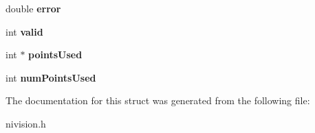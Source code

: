 \begin{DoxyCompactItemize}
\item 
\hypertarget{structBestEllipse2__struct_aaa2ac4cc8639fde286723fa2154bbc69}{
double {\bfseries error}}
\label{structBestEllipse2__struct_aaa2ac4cc8639fde286723fa2154bbc69}

\item 
\hypertarget{structBestEllipse2__struct_a0dbb91e79bbe2676ec1ace63fbf6b3ec}{
int {\bfseries valid}}
\label{structBestEllipse2__struct_a0dbb91e79bbe2676ec1ace63fbf6b3ec}

\item 
\hypertarget{structBestEllipse2__struct_aea03634e451f6cefc809dcb34ff55873}{
int $\ast$ {\bfseries pointsUsed}}
\label{structBestEllipse2__struct_aea03634e451f6cefc809dcb34ff55873}

\item 
\hypertarget{structBestEllipse2__struct_a1c152f7ec28e71759a0b62cbed7d9f71}{
int {\bfseries numPointsUsed}}
\label{structBestEllipse2__struct_a1c152f7ec28e71759a0b62cbed7d9f71}

\end{DoxyCompactItemize}


The documentation for this struct was generated from the following file:\begin{DoxyCompactItemize}
\item 
nivision.h\end{DoxyCompactItemize}
